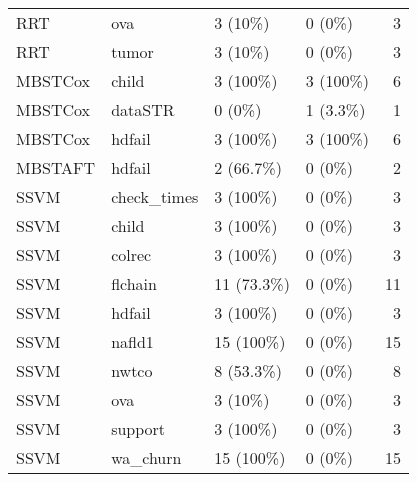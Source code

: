\begin{longtable}[t]{llllr}
RRT & ova & 3 (10\%) & 0 (0\%) & 3\\
RRT & tumor & 3 (10\%) & 0 (0\%) & 3\\
MBSTCox & child & 3 (100\%) & 3 (100\%) & 6\\
MBSTCox & dataSTR & 0 (0\%) & 1 (3.3\%) & 1\\
MBSTCox & hdfail & 3 (100\%) & 3 (100\%) & 6\\
MBSTAFT & hdfail & 2 (66.7\%) & 0 (0\%) & 2\\
SSVM & check\_times & 3 (100\%) & 0 (0\%) & 3\\
SSVM & child & 3 (100\%) & 0 (0\%) & 3\\
SSVM & colrec & 3 (100\%) & 0 (0\%) & 3\\
SSVM & flchain & 11 (73.3\%) & 0 (0\%) & 11\\
SSVM & hdfail & 3 (100\%) & 0 (0\%) & 3\\
SSVM & nafld1 & 15 (100\%) & 0 (0\%) & 15\\
SSVM & nwtco & 8 (53.3\%) & 0 (0\%) & 8\\
SSVM & ova & 3 (10\%) & 0 (0\%) & 3\\
SSVM & support & 3 (100\%) & 0 (0\%) & 3\\
SSVM & wa\_churn & 15 (100\%) & 0 (0\%) & 15\\
\bottomrule
\end{longtable}
